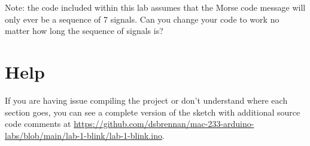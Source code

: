 \documentclass[11pt,a4paper]{article}
\begin{document}
\noindent
Note: the code included within this lab assumes that the Morse code message will only ever be a sequence of 7 signals. Can you change your code to work no matter how long the sequence of signals is?

\section*{Help}
If you are having issue compiling the project or don't understand where each section goes, you can see a complete version of the sketch with additional source code comments at \url{https://github.com/dsbrennan/mac-233-arduino-labs/blob/main/lab-1-blink/lab-1-blink.ino}.

\vspace{2em}

\begin{center}
\end{center}
\end{document}
